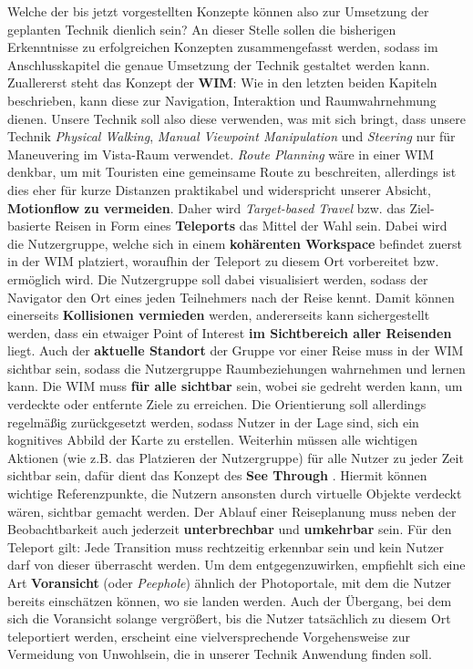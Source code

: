 Welche der bis jetzt vorgestellten Konzepte können also zur Umsetzung der geplanten Technik dienlich sein? An dieser Stelle sollen die bisherigen Erkenntnisse zu erfolgreichen Konzepten zusammengefasst werden, sodass im Anschlusskapitel die genaue Umsetzung der Technik gestaltet werden kann.
Zuallererst steht das Konzept der \textbf{WIM}: Wie in den letzten beiden Kapiteln beschrieben, kann diese zur Navigation, Interaktion und Raumwahrnehmung dienen. 
Unsere Technik soll also diese verwenden, was mit sich bringt, dass unsere Technik \textit{Physical Walking}, \textit{Manual Viewpoint Manipulation} und \textit{Steering} nur für Maneuvering im Vista-Raum verwendet. \textit{Route Planning} wäre in einer WIM denkbar, um mit Touristen eine gemeinsame Route zu beschreiten, allerdings ist dies eher für kurze Distanzen praktikabel und widerspricht unserer Absicht, \textbf{Motionflow zu vermeiden}. Daher wird \textit{Target-based Travel} bzw. das Ziel-basierte Reisen in Form eines \textbf{Teleports} das Mittel der Wahl sein. Dabei wird die Nutzergruppe, welche sich in einem \textbf{kohärenten Workspace} befindet zuerst in der WIM platziert, woraufhin der Teleport zu diesem Ort vorbereitet bzw. ermöglich wird.
Die Nutzergruppe soll dabei visualisiert werden, sodass der Navigator den Ort eines jeden Teilnehmers nach der Reise kennt. Damit können einerseits \textbf{Kollisionen vermieden} werden, andererseits kann sichergestellt werden, dass ein etwaiger Point of Interest \textbf{im Sichtbereich aller Reisenden} liegt. Auch der \textbf{aktuelle Standort} der Gruppe vor einer Reise muss in der WIM sichtbar sein, sodass die Nutzergruppe Raumbeziehungen wahrnehmen und lernen kann. Die WIM muss \textbf{für alle sichtbar} sein, wobei sie gedreht werden kann, um verdeckte oder entfernte Ziele zu erreichen. Die Orientierung soll allerdings regelmäßig zurückgesetzt werden, sodass Nutzer in der Lage sind, sich ein kognitives Abbild der Karte zu erstellen.  Weiterhin müssen alle wichtigen Aktionen (wie z.B. das Platzieren der Nutzergruppe) für alle Nutzer zu jeder Zeit sichtbar sein, dafür dient das Konzept des \textbf{See Through} \cite{Argelaguet2011See-throughReality}. Hiermit können wichtige Referenzpunkte, die Nutzern ansonsten durch virtuelle Objekte verdeckt wären, sichtbar gemacht werden.
Der Ablauf einer Reiseplanung muss neben der Beobachtbarkeit auch jederzeit \textbf{unterbrechbar} und \textbf{umkehrbar} sein. Für den Teleport gilt: Jede Transition muss rechtzeitig erkennbar sein und kein Nutzer darf von dieser überrascht werden.
Um dem entgegenzuwirken, empfiehlt sich eine Art \textbf{Voransicht} (oder \textit{Peephole}) ähnlich der Photoportale, mit dem die Nutzer bereits einschätzen können, wo sie landen werden. Auch der Übergang, bei dem sich die Voransicht solange vergrößert, bis die Nutzer tatsächlich zu diesem Ort teleportiert werden, erscheint eine vielversprechende Vorgehensweise zur Vermeidung von Unwohlsein, die in unserer Technik Anwendung finden soll.
